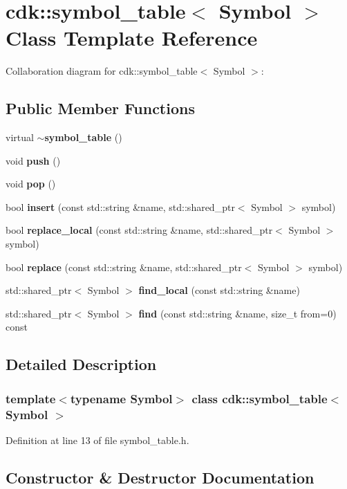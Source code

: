 \section{cdk\+:\+:symbol\+\_\+table$<$ Symbol $>$ Class Template Reference}
\label{classcdk_1_1symbol__table}


Collaboration diagram for cdk\+:\+:symbol\+\_\+table$<$ Symbol $>$\+:
\subsection*{Public Member Functions}
\begin{DoxyCompactItemize}
\item 
virtual \textbf{ $\sim$symbol\+\_\+table} ()
\item 
void \textbf{ push} ()
\item 
void \textbf{ pop} ()
\item 
bool \textbf{ insert} (const std\+::string \&name, std\+::shared\+\_\+ptr$<$ Symbol $>$ symbol)
\item 
bool \textbf{ replace\+\_\+local} (const std\+::string \&name, std\+::shared\+\_\+ptr$<$ Symbol $>$ symbol)
\item 
bool \textbf{ replace} (const std\+::string \&name, std\+::shared\+\_\+ptr$<$ Symbol $>$ symbol)
\item 
std\+::shared\+\_\+ptr$<$ Symbol $>$ \textbf{ find\+\_\+local} (const std\+::string \&name)
\item 
std\+::shared\+\_\+ptr$<$ Symbol $>$ \textbf{ find} (const std\+::string \&name, size\+\_\+t from=0) const
\end{DoxyCompactItemize}


\subsection{Detailed Description}
\subsubsection*{template$<$typename Symbol$>$\newline
class cdk\+::symbol\+\_\+table$<$ Symbol $>$}



Definition at line 13 of file symbol\+\_\+table.\+h.



\subsection{Constructor \& Destructor Documentation}
\mbox{\label{classcdk_1_1symbol__table_af25f5665467f9bb061b83ca997fd13e6}} 
